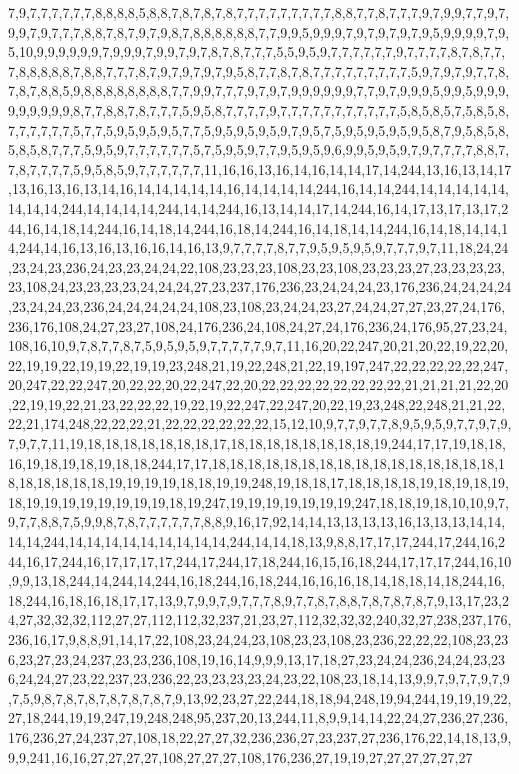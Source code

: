 7,9,7,7,7,7,7,7,8,8,8,8,5,8,8,7,8,7,8,7,8,7,7,7,7,7,7,7,7,7,8,8,7,7,8,7,7,7,9,7,9,9,7,7,9,7,9,9,7,9,7,7,7,8,8,7,8,7,9,7,9,8,7,8,8,8,8,8,8,7,7,9,9,5,9,9,9,7,9,7,9,7,9,7,9,5,9,9,9,9,7,9,5,10,9,9,9,9,9,9,7,9,9,9,7,9,9,7,9,7,8,7,8,7,7,7,5,5,9,5,9,7,7,7,7,7,7,9,7,7,7,7,8,7,8,7,7,7,8,8,8,8,8,7,8,8,7,7,7,8,7,9,7,9,7,9,7,9,5,8,7,7,8,7,8,7,7,7,7,7,7,7,7,7,5,9,7,9,7,9,7,7,8,7,8,7,8,8,5,9,8,8,8,8,8,8,8,8,7,7,9,9,7,7,7,9,7,9,7,9,9,9,9,9,9,7,7,9,7,9,9,9,5,9,9,5,9,9,9,9,9,9,9,9,9,8,7,7,8,8,7,8,7,7,7,5,9,5,8,7,7,7,7,9,7,7,7,7,7,7,7,7,7,7,7,5,8,5,8,5,7,5,8,5,8,7,7,7,7,7,7,5,7,7,5,9,5,9,5,9,5,7,7,5,9,5,9,5,9,5,9,7,9,5,7,5,9,5,9,5,9,5,9,5,8,7,9,5,8,5,8,5,8,5,8,7,7,7,5,9,5,9,7,7,7,7,7,7,5,7,5,9,5,9,7,7,9,5,9,5,9,6,9,9,5,9,5,9,7,9,7,7,7,7,8,8,7,7,8,7,7,7,7,5,9,5,8,5,9,7,7,7,7,7,7,11,16,16,13,16,14,16,14,14,17,14,244,13,16,13,14,17,13,16,13,16,13,14,16,14,14,14,14,14,16,14,14,14,14,244,16,14,14,244,14,14,14,14,14,14,14,14,244,14,14,14,14,244,14,14,244,16,13,14,14,17,14,244,16,14,17,13,17,13,17,244,16,14,18,14,244,16,14,18,14,244,16,18,14,244,16,14,18,14,14,244,16,14,18,14,14,14,244,14,16,13,16,13,16,16,14,16,13,9,7,7,7,7,8,7,7,9,5,9,5,9,5,9,7,7,7,9,7,11,18,24,24,23,24,23,236,24,23,23,24,24,22,108,23,23,23,108,23,23,108,23,23,23,27,23,23,23,23,23,108,24,23,23,23,23,24,24,24,27,23,237,176,236,23,24,24,24,23,176,236,24,24,24,24,23,24,24,23,236,24,24,24,24,24,108,23,108,23,24,24,23,27,24,24,27,27,23,27,24,176,236,176,108,24,27,23,27,108,24,176,236,24,108,24,27,24,176,236,24,176,95,27,23,24,108,16,10,9,7,8,7,7,8,7,5,9,5,9,5,9,7,7,7,7,7,9,7,11,16,20,22,247,20,21,20,22,19,22,20,22,19,19,22,19,19,22,19,19,23,248,21,19,22,248,21,22,19,197,247,22,22,22,22,22,247,20,247,22,22,247,20,22,22,20,22,247,22,20,22,22,22,22,22,22,22,22,21,21,21,21,22,20,22,19,19,22,21,23,22,22,22,19,22,19,22,247,22,247,20,22,19,23,248,22,248,21,21,22,22,21,174,248,22,22,22,21,22,22,22,22,22,22,15,12,10,9,7,7,9,7,7,8,9,5,9,5,9,7,7,9,7,9,7,9,7,7,11,19,18,18,18,18,18,18,18,17,18,18,18,18,18,18,18,18,19,244,17,17,19,18,18,16,19,18,19,18,19,18,18,244,17,17,18,18,18,18,18,18,18,18,18,18,18,18,18,18,18,18,18,18,18,18,18,18,19,19,19,19,18,18,19,19,248,19,18,18,17,18,18,18,18,19,18,19,18,19,18,19,19,19,19,19,19,19,19,18,19,247,19,19,19,19,19,19,19,247,18,18,19,18,10,10,9,7,9,7,7,8,8,7,5,9,9,8,7,8,7,7,7,7,7,7,8,8,9,16,17,92,14,14,13,13,13,13,16,13,13,13,14,14,14,14,244,14,14,14,14,14,14,14,14,14,244,14,14,18,13,9,8,8,17,17,17,244,17,244,16,244,16,17,244,16,17,17,17,17,244,17,244,17,18,244,16,15,16,18,244,17,17,17,244,16,10,9,9,13,18,244,14,244,14,244,16,18,244,16,18,244,16,16,16,18,14,18,18,14,18,244,16,18,244,16,18,16,18,17,17,13,9,7,9,9,7,9,7,7,7,8,9,7,7,8,7,8,8,7,8,7,8,7,8,7,9,13,17,23,24,27,32,32,32,112,27,27,112,112,32,237,21,23,27,112,32,32,32,240,32,27,238,237,176,236,16,17,9,8,8,91,14,17,22,108,23,24,24,23,108,23,23,108,23,236,22,22,22,108,23,236,23,27,23,24,237,23,23,236,108,19,16,14,9,9,9,13,17,18,27,23,24,24,236,24,24,23,236,24,24,27,23,22,237,23,236,22,23,23,23,23,24,23,22,108,23,18,14,13,9,9,7,9,7,7,9,7,9,7,5,9,8,7,8,7,8,7,8,7,8,7,8,7,9,13,92,23,27,22,244,18,18,94,248,19,94,244,19,19,19,22,27,18,244,19,19,247,19,248,248,95,237,20,13,244,11,8,9,9,14,14,22,24,27,236,27,236,176,236,27,24,237,27,108,18,22,27,27,32,236,236,27,23,237,27,236,176,22,14,18,13,9,9,9,241,16,16,27,27,27,27,108,27,27,27,108,176,236,27,19,19,27,27,27,27,27,27